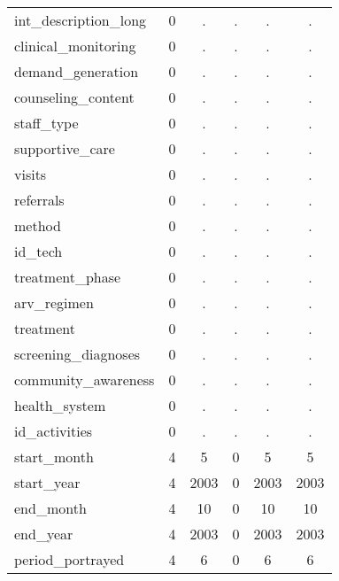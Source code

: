 \begin{table}[htbp]
\begin{tabular}{l*{1}{ccccc}}
int\_description\_long&           0&           .&           .&           .&           .\\
clinical\_monitoring&           0&           .&           .&           .&           .\\
demand\_generation&           0&           .&           .&           .&           .\\
counseling\_content&           0&           .&           .&           .&           .\\
staff\_type  &           0&           .&           .&           .&           .\\
supportive\_care&           0&           .&           .&           .&           .\\
visits      &           0&           .&           .&           .&           .\\
referrals   &           0&           .&           .&           .&           .\\
method      &           0&           .&           .&           .&           .\\
id\_tech     &           0&           .&           .&           .&           .\\
treatment\_phase&           0&           .&           .&           .&           .\\
arv\_regimen &           0&           .&           .&           .&           .\\
treatment   &           0&           .&           .&           .&           .\\
screening\_diagnoses&           0&           .&           .&           .&           .\\
community\_awareness&           0&           .&           .&           .&           .\\
health\_system&           0&           .&           .&           .&           .\\
id\_activities&           0&           .&           .&           .&           .\\
start\_month &           4&           5&           0&           5&           5\\
start\_year  &           4&        2003&           0&        2003&        2003\\
end\_month   &           4&          10&           0&          10&          10\\
end\_year    &           4&        2003&           0&        2003&        2003\\
period\_portrayed&           4&           6&           0&           6&           6\\

\end{tabular}
\end{table}
